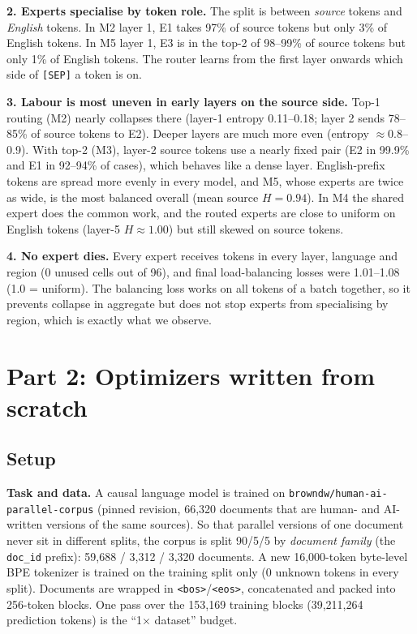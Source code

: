 \documentclass[11pt,a4paper]{article}
\begin{document}
\textbf{2. Experts specialise by token role.} The split is between \emph{source} tokens and \emph{English} tokens. In M2 layer 1, E1 takes 97\% of source tokens but only 3\% of English tokens. In M5 layer 1, E3 is in the top-2 of 98--99\% of source tokens but only 1\% of English tokens. The router learns from the first layer onwards which side of \texttt{[SEP]} a token is on.

\textbf{3. Labour is most uneven in early layers on the source side.} Top-1 routing (M2) nearly collapses there (layer-1 entropy 0.11--0.18; layer 2 sends 78--85\% of source tokens to E2). Deeper layers are much more even (entropy $\approx$0.8--0.9). With top-2 (M3), layer-2 source tokens use a nearly fixed pair (E2 in 99.9\% and E1 in 92--94\% of cases), which behaves like a dense layer. English-prefix tokens are spread more evenly in every model, and M5, whose experts are twice as wide, is the most balanced overall (mean source $H=0.94$). In M4 the shared expert does the common work, and the routed experts are close to uniform on English tokens (layer-5 $H\approx1.00$) but still skewed on source tokens.

\textbf{4. No expert dies.} Every expert receives tokens in every layer, language and region (0 unused cells out of 96), and final load-balancing losses were 1.01--1.08 (1.0 = uniform). The balancing loss works on all tokens of a batch together, so it prevents collapse in aggregate but does not stop experts from specialising by region, which is exactly what we observe.

\section{Part 2: Optimizers written from scratch}

\subsection{Setup}
\textbf{Task and data.} A causal language model is trained on \texttt{browndw/human-ai-parallel-corpus} (pinned revision, 66,320 documents that are human- and AI-written versions of the same sources). So that parallel versions of one document never sit in different splits, the corpus is split 90/5/5 by \emph{document family} (the \texttt{doc\_id} prefix): 59,688 / 3,312 / 3,320 documents. A new 16,000-token byte-level BPE tokenizer is trained on the training split only (0 unknown tokens in every split). Documents are wrapped in \texttt{<bos>}/\texttt{<eos>}, concatenated and packed into 256-token blocks. One pass over the 153,169 training blocks (39,211,264 prediction tokens) is the ``1$\times$ dataset'' budget.
\end{document}
